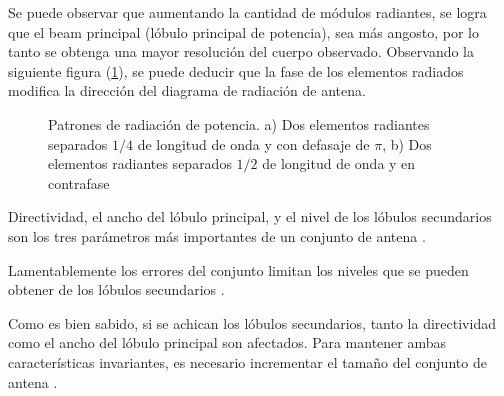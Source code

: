 Se puede observar que aumentando la cantidad de módulos radiantes, se logra que el beam principal (lóbulo principal de
potencia), sea más angosto, por lo tanto se obtenga una mayor resolución del cuerpo observado. Observando la siguiente
figura (\ref{fig:directArrayPat}), se puede deducir que la fase de los elementos radiados modifica la dirección del
diagrama de radiación de antena.

\begin{figure}[H]
	\centering
	\caption{Patrones de radiación de potencia. a) Dos elementos radiantes separados $1/4$ de longitud de onda y con
		defasaje de $\pi$, b) Dos elementos radiantes separados $1/2$ de longitud de onda y en contrafase}
	\label{fig:directArrayPat}
\end{figure}

Directividad, el ancho del lóbulo principal, y el nivel de los lóbulos secundarios son los tres parámetros más importantes
de un conjunto de antena \cite{Hsiao1985}.

Lamentablemente los errores del conjunto limitan los niveles que se pueden obtener de los lóbulos secundarios \cite{Hsiao1985}.

Como es bien sabido, si se achican los lóbulos secundarios, tanto la directividad como el ancho del lóbulo principal son
afectados. Para mantener ambas características invariantes, es necesario incrementar el tamaño del conjunto de antena
\cite{Hsiao1985}.


